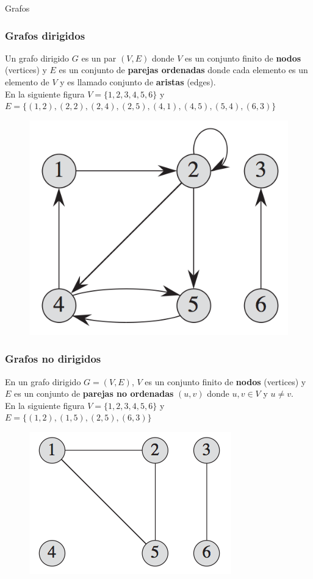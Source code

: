 \documentclass{beamer}
\begin{document}
\begin{section}{Grafos}
	\begin{frame}
		\frametitle{Grafos dirigidos}
		Un grafo dirigido $G$ es un par $(V, E)$ donde $V$ es un conjunto finito de \textbf{nodos} (vertices) y $E$ es un conjunto de \textbf{parejas ordenadas} donde cada elemento es un elemento de $V$ y es llamado conjunto de \textbf{aristas} (edges).\\
		En la siguiente figura $V = \{1, 2, 3, 4, 5, 6\}$ y $E = \{(1, 2), (2, 2), (2, 4), (2, 5), (4, 1), (4, 5), (5, 4), (6, 3)\}$
		\begin{figure}
			\includegraphics[height = 0.35\textheight]{digraph.png}
		\end{figure}		
	\end{frame}
	
	\begin{frame}
		\frametitle{Grafos no dirigidos}
		En un grafo dirigido $G = (V, E)$, $V$ es un conjunto finito de \textbf{nodos} (vertices) y $E$ es un conjunto de \textbf{parejas no ordenadas} $(u, v)$ donde $u, v \in V$ y $u \ne v$.\\
		En la siguiente figura $V = \{1, 2, 3, 4, 5, 6\}$ y $E = \{(1, 2), (1, 5), (2, 5), (6, 3)\}$
		\begin{figure}
			\includegraphics[height = 0.35\textheight]{graph.png}
		\end{figure}		
	\end{frame}
	

\end{section}
\end{document}
